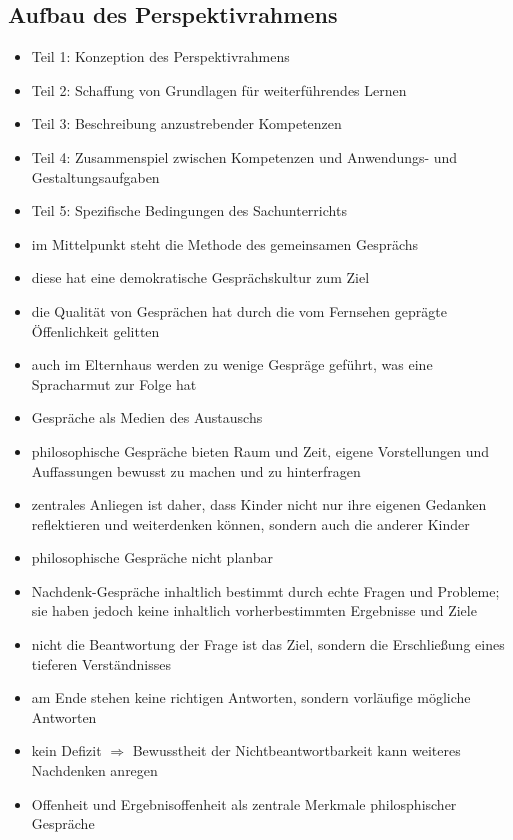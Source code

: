 \subsection{Aufbau des Perspektivrahmens}

\begin{itemize}
	\item{Teil 1: Konzeption des Perspektivrahmens}
	\item{Teil 2: Schaffung von Grundlagen für weiterführendes Lernen}
	\item{Teil 3: Beschreibung anzustrebender Kompetenzen}
	\item{Teil 4: Zusammenspiel zwischen Kompetenzen und Anwendungs- und Gestaltungsaufgaben}
	\item{Teil 5: Spezifische Bedingungen des Sachunterrichts}


\end{itemize}

\newpage


\begin{itemize}
	\item{im Mittelpunkt steht die Methode des gemeinsamen Gesprächs}
	\item{diese hat eine demokratische Gesprächskultur zum Ziel}
	\item{die Qualität von Gesprächen hat durch die vom Fernsehen geprägte Öffenlichkeit gelitten}
	\item{auch im Elternhaus werden zu wenige Gespräge geführt, was eine Spracharmut zur Folge hat}
	\item{Gespräche als Medien des Austauschs}
	\item{philosophische Gespräche bieten Raum und Zeit, eigene Vorstellungen und Auffassungen bewusst zu machen und zu hinterfragen}
	\item{zentrales Anliegen ist daher, dass Kinder nicht nur ihre eigenen Gedanken reflektieren und weiterdenken können, sondern auch die anderer Kinder}
	\item{philosophische Gespräche nicht planbar}
	\item{Nachdenk-Gespräche inhaltlich bestimmt durch echte Fragen und Probleme; sie haben jedoch keine inhaltlich vorherbestimmten Ergebnisse und Ziele}
	\item{nicht die Beantwortung der Frage ist das Ziel, sondern die Erschließung eines tieferen Verständnisses}
	\item{am Ende stehen keine richtigen Antworten, sondern vorläufige mögliche Antworten}
	\item{kein Defizit $\Rightarrow$ Bewusstheit der Nichtbeantwortbarkeit kann weiteres Nachdenken anregen}
	\item{Offenheit und Ergebnisoffenheit als zentrale Merkmale philosphischer Gespräche}

\end{itemize}

